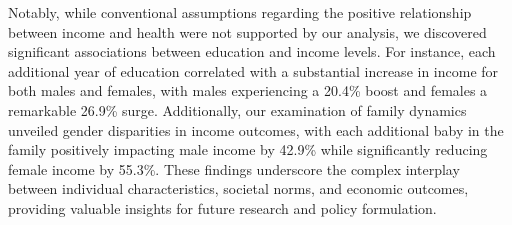 \documentclass{article}[13pt]
\begin{document}
\qquad Notably, while conventional assumptions regarding the positive relationship between income and health were 
not supported by our analysis, we discovered significant associations between education and income levels. For 
instance, each additional year of education correlated with a substantial increase in income for both males and females, 
with males experiencing a 20.4\% boost and females a remarkable 26.9\% surge. Additionally, our examination of family dynamics 
unveiled gender disparities in income outcomes, with each additional baby in the family positively impacting male income by 42.9\% 
while significantly reducing female income by 55.3\%. These findings underscore the complex interplay between individual characteristics, 
societal norms, and economic outcomes, providing valuable insights for future research and policy formulation.
\end{document}
